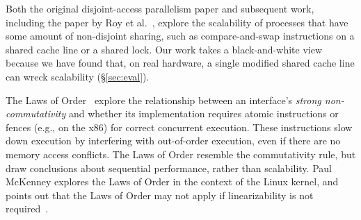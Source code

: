 


Both the original disjoint-access parallelism paper and subsequent work,
including the paper by Roy et al.~\cite{roy:limits-dap}, explore the scalability
of processes that have some amount of non-disjoint sharing, such as
compare-and-swap instructions on a shared cache line or a shared lock.
Our work takes a black-and-white view because we have found that, on real
hardware, a single modified
shared cache line can wreck
scalability (\S\ref{sec:eval}).

The Laws of Order~\cite{law:orders} explore the relationship between an
interface's \emph{strong non-commutativity} and whether its implementation
requires atomic instructions or fences (e.g.,  on the x86) for
correct concurrent execution.  These instructions slow down execution by
interfering with out-of-order execution, even if there are no memory access
conflicts.  The Laws of Order resemble the commutativity rule, but draw
conclusions about sequential performance, rather than scalability.
%
Paul McKenney
explores the Laws of Order in the context of the Linux kernel, and points out
that the Laws of Order may not apply if linearizability is not
required~\cite{lwn:law}.


